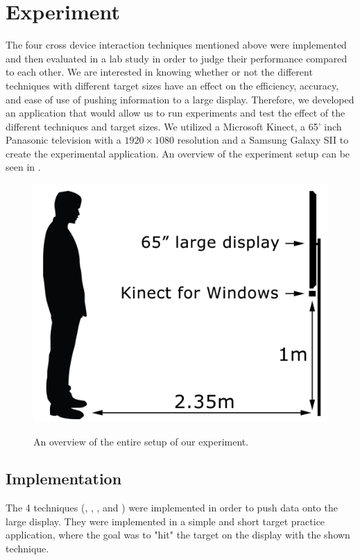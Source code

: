 \section{Experiment} \label{sec:experiment}
The four cross device interaction techniques mentioned above were implemented and then evaluated in a lab study in order to judge their performance compared to each other. 
We are interested in knowing whether or not the different techniques with different target sizes have an effect on the efficiency, accuracy, and ease of use of pushing information to a large display. Therefore, we developed an application that would allow us to run experiments and test the effect of the different techniques and target sizes. 
We utilized a Microsoft Kinect, a 65' inch Panasonic television with a $1920 \times 1080$ resolution and a Samsung Galaxy SII to create the experimental application. 
An overview of the experiment setup can be seen in . 

\begin{figure}[H]
	\centering
	{\includegraphics[width = 0.7\columnwidth]{images/SetupIllustration.jpg}}
	\caption{
		\protect An overview of the entire setup of our experiment.
	}
	\label{fig:entireSetup}
\end{figure}

\subsection{Implementation}

The 4 techniques (\swipe, \tilt, \throw, and \pinch) were implemented in order to push data onto the large display. 
They were implemented in a simple and short target practice application, where the goal was to "hit" the target on the display with the shown technique. 

